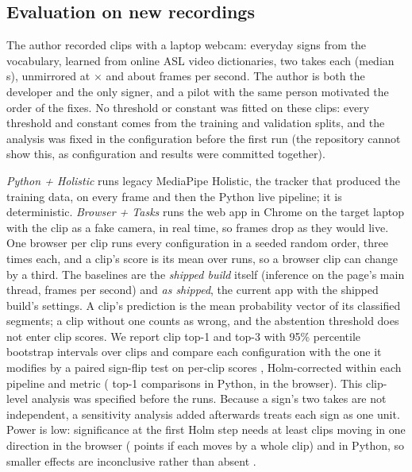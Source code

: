 \subsection{Evaluation on new recordings}

The author recorded  clips with a laptop webcam:  everyday signs from the
vocabulary, learned from online ASL video dictionaries, two takes each (median
\,s), unmirrored at $\times$ and about  frames
per second. The author is both the developer and the only signer, and a pilot with the same person
motivated the order of the fixes. No threshold or constant was fitted on these clips: every
threshold and constant comes from the training and validation splits, and the analysis was fixed
in the configuration before the first run (the repository cannot show this, as configuration and
results were committed together).

\emph{Python + Holistic} runs legacy MediaPipe Holistic, the tracker that produced the training
data, on every frame and then the Python live pipeline; it is deterministic. \emph{Browser +
Tasks} runs the web app in Chrome on the target laptop with the clip as a fake camera, in real
time, so frames drop as they would live. One browser per clip runs every configuration in a
seeded random order, three times each, and a clip's score is its mean over runs, so a browser clip
can change by a third. The baselines are the \emph{shipped build} itself (inference on the page's
main thread,  frames per second) and \emph{as shipped}, the current app
with the shipped build's settings. A clip's prediction is the mean probability vector of its
classified segments; a clip without one counts as wrong, and the abstention threshold does not
enter clip scores. We report clip top-1 and top-3 with 95\% percentile bootstrap intervals over
clips \cite{efron1994bootstrap} and compare each configuration with the one it modifies by a
paired sign-flip test on per-clip scores \cite{dror2018hitchhiker}, Holm-corrected within each
pipeline and metric \cite{dror2017replicability} ( top-1 comparisons in Python,
 in the browser). This clip-level analysis was specified before the runs.
Because a sign's two takes are not independent, a sensitivity analysis added afterwards treats
each sign as one unit. Power is low: significance at the first Holm step needs at least
 clips moving in one direction in the browser ( points if each moves
by a whole clip) and  in Python, so smaller effects are inconclusive rather than
absent \cite{card2020power}.

